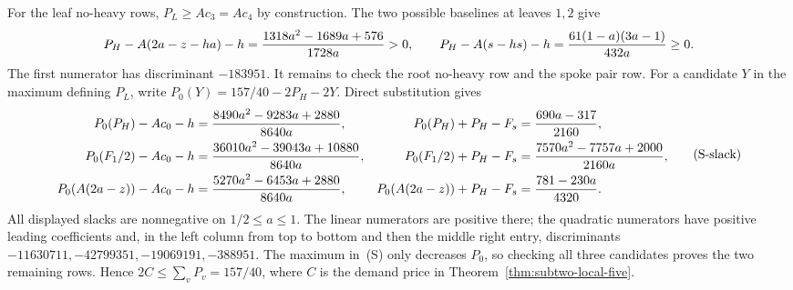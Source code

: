 \documentclass[11pt]{article}
\theoremstyle{definition}\newtheorem{algorithm}{Algorithm}[section]
\numberwithin{equation}{section}
\theoremstyle{remark}\newtheorem*{remark}{Remark}
\begin{document}
For the leaf no-heavy rows, $P_L\ge Ac_3=Ac_4$ by construction.
The two possible baselines at leaves $1,2$ give
\[
 P_H-A(2a-z-ha)-h
 ={1318a^2-1689a+576\over1728a}>0,\qquad
 P_H-A(s-hs)-h
 ={61(1-a)(3a-1)\over432a}\ge0.
\]
The first numerator has discriminant $-183951$.
It remains to check the root no-heavy row and the spoke pair row.
For a candidate $Y$ in the maximum defining $P_L$, write
$P_0(Y)=157/40-2P_H-2Y$. Direct substitution gives
\[
\begin{aligned}
 P_0(P_H)-Ac_0-h
   &={8490a^2-9283a+2880\over8640a},&
 P_0(P_H)+P_H-F_s
   &={690a-317\over2160},\\
 P_0(F_1/2)-Ac_0-h
   &={36010a^2-39043a+10880\over8640a},&
 P_0(F_1/2)+P_H-F_s
   &={7570a^2-7757a+2000\over2160a},\\
 P_0(A(2a-z))-Ac_0-h
   &={5270a^2-6453a+2880\over8640a},&
 P_0(A(2a-z))+P_H-F_s
   &={781-230a\over4320}.
\end{aligned}                                                \tag{S-slack}
\]
All displayed slacks are nonnegative on $1/2\le a\le1$.
The linear numerators are positive there; the quadratic numerators
have positive leading coefficients and, in the left column from
top to bottom and then the middle right entry, discriminants
$-11630711,-42799351,-19069191,-388951$.
The maximum in~(S) only decreases $P_0$, so checking all three
candidates proves the two remaining rows. Hence
$2C\le\sum_vP_v=157/40$, where $C$ is the demand price in
Theorem~\ref{thm:subtwo-local-five}.
\end{document}
